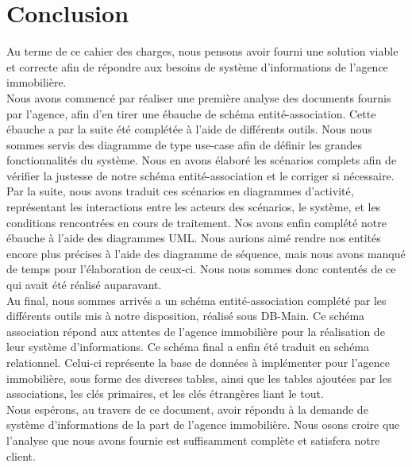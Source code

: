 \newpage
\section{Conclusion}
Au terme de ce cahier des charges, nous pensons avoir fourni une solution viable et correcte afin de répondre aux besoins de système d'informations de l'agence immobilière.\\

Nous avons commencé par réaliser une première analyse des documents fournis par l'agence, afin d'en tirer une ébauche de schéma entité-association. Cette ébauche a par la suite été complétée à l'aide de différents outils. Nous nous sommes servis des diagramme de type use-case afin de définir les grandes fonctionnalités du système. Nous en avons élaboré les scénarios complets afin de vérifier la justesse de notre schéma entité-association et le corriger si nécessaire. Par la suite, nous avons traduit ces scénarios en diagrammes d'activité, représentant les interactions entre les acteurs des scénarios, le système, et les conditions rencontrées en cours de traitement. Nos avons enfin complété notre ébauche à l'aide des diagrammes UML. Nous aurions aimé rendre nos entités encore plus précises à l'aide des diagramme de séquence, mais nous avons manqué de temps pour l'élaboration de ceux-ci. Nous nous sommes donc contentés de ce qui avait été réalisé auparavant.\\

Au final, nous sommes arrivés a un schéma entité-association complété par les différents outils mis à notre disposition, réalisé sous DB-Main. Ce schéma association répond aux attentes de l'agence immobilière pour la réalisation de leur système d'informations. Ce schéma final a enfin été traduit en schéma relationnel. Celui-ci représente la base de données à implémenter pour l'agence immobilière, sous forme des diverses tables, ainsi que les tables ajoutées par les associations, les clés primaires, et les clés étrangères liant le tout.\\

Nous espérons, au travers de ce document, avoir répondu à la demande de système d'informations de la part de l'agence immobilière. Nous osons croire que l'analyse que nous avons fournie est suffisamment complète et satisfera notre client.